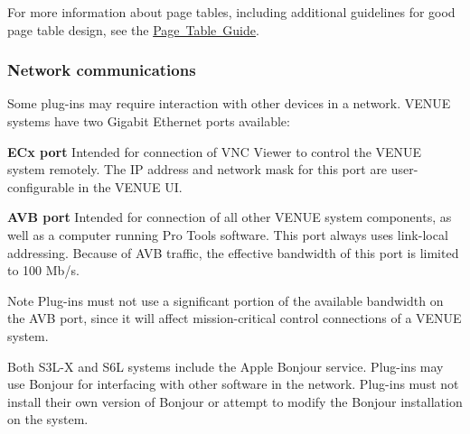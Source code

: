  For more information about page tables, including additional guidelines for good page table design, see the \mbox{\hyperlink{a00833}{Page Table Guide}}.

\hypertarget{a00849_aax_venue_guide__environment__network}{}\subsubsection{Network communications}\label{a00849_aax_venue_guide__environment__network}
 Some plug-\/ins may require interaction with other devices in a network. V\+E\+N\+UE systems have two Gigabit Ethernet ports available\+: 
\begin{DoxyEnumerate}
\item {\bfseries{E\+Cx port}} Intended for connection of V\+NC Viewer to control the V\+E\+N\+UE system remotely. The IP address and network mask for this port are user-\/configurable in the V\+E\+N\+UE UI. 
\item {\bfseries{A\+VB port}} Intended for connection of all other V\+E\+N\+UE system components, as well as a computer running Pro Tools software. This port always uses link-\/local addressing. Because of A\+VB traffic, the effective bandwidth of this port is limited to 100 Mb/s. \begin{DoxyNote}{Note}
Plug-\/ins must not use a significant portion of the available bandwidth on the A\+VB port, since it will affect mission-\/critical control connections of a V\+E\+N\+UE system. 
\end{DoxyNote}

\end{DoxyEnumerate}

 Both S3\+L-\/X and S6L systems include the Apple Bonjour service. Plug-\/ins may use Bonjour for interfacing with other software in the network. Plug-\/ins must not install their own version of Bonjour or attempt to modify the Bonjour installation on the system.

